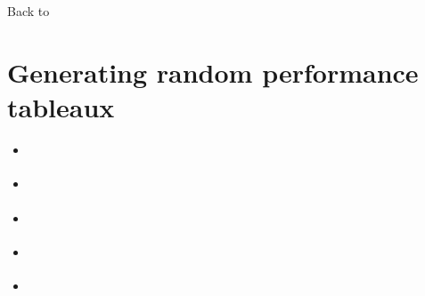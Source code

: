 \documentclass[a4paper,12pt,english]{sphinxhowto}
\begin{document}
Back to {\hyperref[\detokenize{tutorial:tutorial-label}]{}}


\section{Generating random performance tableaux}
\label{\detokenize{tutorial:generating-random-performance-tableaux}}\label{\detokenize{tutorial:randomperformancetableau-tutorial-label}}
\begin{sphinxShadowBox}
\begin{itemize}
\item {} 
\label{\detokenize{tutorial:id186}}{\hyperref[\detokenize{tutorial:introduction}]{}}

\item {} 
\label{\detokenize{tutorial:id187}}{\hyperref[\detokenize{tutorial:generating-standard-random-performance-tableaux}]{}}

\item {} 
\label{\detokenize{tutorial:id188}}{\hyperref[\detokenize{tutorial:generating-random-cost-benefit-performance-tableaux}]{}}

\item {} 
\label{\detokenize{tutorial:id189}}{\hyperref[\detokenize{tutorial:generating-random-three-objectives-performance-tableaux}]{}}

\item {} 
\label{\detokenize{tutorial:id190}}{\hyperref[\detokenize{tutorial:generating-random-linearly-ranked-performance-tableaux}]{}}

\end{itemize}
\end{sphinxShadowBox}
\end{document}

